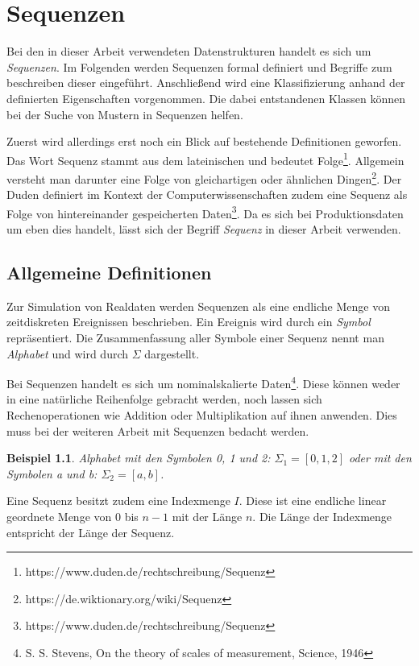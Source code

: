 \newtheorem{theorem}{Beispiel}[section]

\chapter{Sequenzen}
\label{chp:sequences}
Bei den in dieser Arbeit verwendeten Datenstrukturen handelt es sich um \textit{Sequenzen}. Im Folgenden werden Sequenzen formal definiert und Begriffe zum beschreiben dieser eingeführt. Anschließend wird eine Klassifizierung anhand der definierten Eigenschaften vorgenommen. Die dabei entstandenen Klassen können bei der Suche von Mustern in Sequenzen helfen.

Zuerst wird allerdings erst noch ein Blick auf bestehende Definitionen geworfen. Das Wort Sequenz stammt aus dem lateinischen und bedeutet Folge\footnote{https://www.duden.de/rechtschreibung/Sequenz}. Allgemein versteht man darunter eine Folge von gleichartigen oder ähnlichen Dingen\footnote{https://de.wiktionary.org/wiki/Sequenz}. Der Duden definiert im Kontext der Computerwissenschaften zudem eine Sequenz als Folge von hintereinander gespeicherten Daten\footnote{https://www.duden.de/rechtschreibung/Sequenz}. Da es sich bei Produktionsdaten um eben dies handelt, lässt sich der Begriff \textit{Sequenz} in dieser Arbeit verwenden. 

\section{Allgemeine Definitionen}
Zur Simulation von Realdaten werden Sequenzen als eine endliche Menge von zeitdiskreten Ereignissen beschrieben. Ein Ereignis wird durch ein \textit{Symbol} repräsentiert. Die Zusammenfassung aller  Symbole einer Sequenz nennt man \textit{Alphabet} und wird durch $\Sigma$ dargestellt. 

Bei Sequenzen handelt es sich um nominalskalierte Daten\footnote{S. S. Stevens, On the theory of scales of measurement, Science, 1946}. Diese können weder in eine natürliche Reihenfolge gebracht werden, noch lassen sich Rechenoperationen wie Addition oder Multiplikation auf ihnen anwenden. Dies muss bei der weiteren Arbeit mit Sequenzen bedacht werden.
 
\begin{theorem}
Alphabet mit den Symbolen 0, 1 und 2: $\Sigma_1 = [0,1,2]$ oder mit den Symbolen a und b: $\Sigma_2 = [a,b]$. 
\end{theorem}

Eine Sequenz besitzt zudem eine Indexmenge $I$. Diese ist eine endliche linear geordnete Menge von 0 bis $n-1$ mit der Länge $n$. Die Länge der Indexmenge entspricht der Länge der Sequenz.

